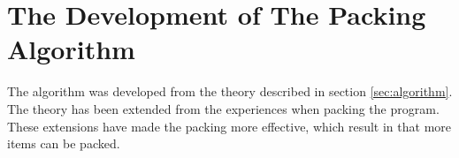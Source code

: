 \section{The Development of The Packing Algorithm}
\label{sec:devalgorithm}
The algorithm was developed from the theory described in section \ref{sec:algorithm}. The theory has been extended from the experiences when packing the program. These extensions have made the packing more effective, which result in that more items can be packed.